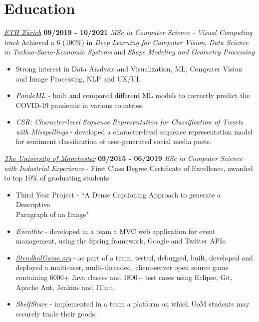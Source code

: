 \documentclass[]{friggeri-cv}
\begin{document}
\section{\color{red}Education}
\begin{entrylist}
    \entry
    {}
    {\large\emph{\href{https://inf.ethz.ch/studies/master/master-cs.html}{ETH Zürich}}}
    {\textbf{09/2019 - 10/2021}}
    {\large\emph{MSc in Computer Science - Visual Computing track}}
    {Achieved a 6 (100\%) in \emph{Deep Learning for Computer Vision}, \emph{Data Science in Techno-Socio-Economic Systems} and \emph{Shape Modeling and Geometry Processing}}\\
    \begin{itemize}
        \item Strong interest in Data Analysis and Visualization, ML, Computer Vision and Image Processing, NLP and UX/UI.
        \item \emph{PandeML} - built and compared different ML models to correctly predict the COVID-19 pandemic in various countries.
        \item \emph{CSR: Character-level Sequence Representation for Classification of Tweets with Misspellings} - developed a character-level sequence representation  model for sentiment classification of user-generated social media posts.
    \end{itemize}
\medskip
  \entry
    {}
    {\large\emph{\href{http://www.manchester.ac.uk/}{The University of Manchester}}}
    {\textbf{09/2015 - 06/2019}}
    {\large\emph{BSc in Computer Science with Industrial Experience} - First Class Degree}
    {Certificate of Excellence, awarded to top 10\% of graduating students}
    \begin{itemize}
        \item Third Year Project - ``A Dense Captioning Approach to generate a Descriptive \\Paragraph of an Image"
        \item \emph{Eventlite} - developed in a team a MVC web application for event management, using the Spring framework, Google and Twitter APIs.
        \item \emph{\href{https://stendhalgame.org/}{StendhalGame.org}} - as part of a team, tested, debugged, built, developed and deployed a multi-user, multi-threaded, client-server open source game containing 6000+ Java classes and 1800+ test cases using Eclipse, Git, Apache Ant, Jenkins and JUnit.
        \item \emph{ShelfShare} - implemented in a team a platform on which UoM students may securely trade their goods.
    \end{itemize}
\end{entrylist}
\end{document}
